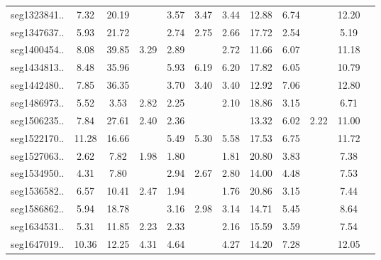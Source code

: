 \begin{table}[t]
\begin{tabular}{cccccccccccc}
    seg1323841.. & 7.32 & 20.19 & \cellcolor{orange}{3.13} & 3.57 & 3.47 & 3.44 & 12.88 & 6.74 & \cellcolor{yellow}{3.33} & 12.20 & \cellcolor{red}{2.95} \\
    seg1347637.. & 5.93 & 21.72 & \cellcolor{red}{1.84} & 2.74 & 2.75 & 2.66 & 17.72 & 2.54 & \cellcolor{yellow}{2.09} & 5.19 & \cellcolor{orange}{1.85} \\
    seg1400454.. & 8.08 & 39.85 & 3.29 & 2.89 & \cellcolor{yellow}{2.63} & 2.72 & 11.66 & 6.07 & \cellcolor{orange}{2.58} & 11.18 & \cellcolor{red}{2.43} \\
    seg1434813.. & 8.48 & 35.96 & \cellcolor{yellow}{4.74} & 5.93 & 6.19 & 6.20 & 17.82 & 6.05 & \cellcolor{orange}{4.50} & 10.79 & \cellcolor{red}{4.30} \\
    seg1442480.. & 7.85 & 36.35 & \cellcolor{orange}{2.97} & 3.70 & 3.40 & 3.40 & 12.92 & 7.06 & \cellcolor{yellow}{2.98} & 12.80 & \cellcolor{red}{2.96} \\
    seg1486973.. & 5.52 & 3.53 & 2.82 & 2.25 & \cellcolor{yellow}{1.72} & 2.10 & 18.86 & 3.15 & \cellcolor{orange}{1.70} & 6.71 & \cellcolor{red}{1.48} \\
    seg1506235.. & 7.84 & 27.61 & 2.40 & 2.36 & \cellcolor{yellow}{2.19} & \cellcolor{orange}{2.12} & 13.32 & 6.02 & 2.22 & 11.00 & \cellcolor{red}{1.83} \\
    seg1522170.. & 11.28 & 16.66 & \cellcolor{yellow}{4.87} & 5.49 & 5.30 & 5.58 & 17.53 & 6.75 & \cellcolor{orange}{4.61} & 11.72 & \cellcolor{red}{4.35} \\
    seg1527063.. & 2.62 & 7.82 & 1.98 & 1.80 & \cellcolor{yellow}{1.56} & 1.81 & 20.80 & 3.83 & \cellcolor{orange}{1.38} & 7.38 & \cellcolor{red}{1.32} \\
    seg1534950.. & 4.31 & 7.80 & \cellcolor{yellow}{2.56} & 2.94 & 2.67 & 2.80 & 14.00 & 4.48 & \cellcolor{orange}{2.29} & 7.53 & \cellcolor{red}{1.92} \\
    seg1536582.. & 6.57 & 10.41 & 2.47 & 1.94 & \cellcolor{yellow}{1.54} & 1.76 & 20.86 & 3.15 & \cellcolor{orange}{1.48} & 7.44 & \cellcolor{red}{1.46} \\
    seg1586862.. & 5.94 & 18.78 & \cellcolor{yellow}{2.60} & 3.16 & 2.98 & 3.14 & 14.71 & 5.45 & \cellcolor{orange}{2.53} & 8.64 & \cellcolor{red}{2.47} \\
    seg1634531.. & 5.31 & 11.85 & 2.23 & 2.33 & \cellcolor{yellow}{1.97} & 2.16 & 15.59 & 3.59 & \cellcolor{red}{1.53} & 7.54 & \cellcolor{orange}{1.79} \\
    seg1647019.. & 10.36 & 12.25 & 4.31 & 4.64 & \cellcolor{yellow}{4.20} & 4.27 & 14.20 & 7.28 & \cellcolor{orange}{3.88} & 12.05 & \cellcolor{red}{3.74} \\

\end{tabular}
\end{table}
